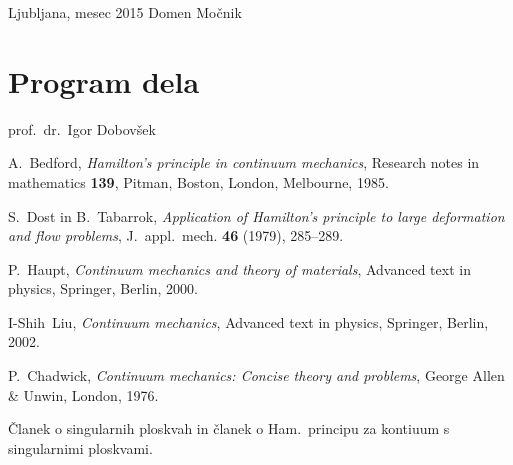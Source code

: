 \documentclass[12pt,a4paper]{report}
\begin{document}
\null

\noindent Ljubljana, mesec 2015 \hfill Domen Močnik
\pagebreak

\tableofcontents
\pagebreak

\chapter*{Program dela}


\null

\noindent prof.~dr.~Igor Dobovšek
\pagebreak


\pagebreak










\begin{thebibliography}{99}

A.~Bedford, \emph{Hamilton's principle in continuum mechanics}, Research notes in mathematics {\bf 139},
Pitman, Boston, London, Melbourne, 1985.

S.~Dost in B.~Tabarrok, \emph{Application of Hamilton's principle to large deformation and flow problems},
J.~appl.~mech. {\bf 46} (1979), 285--289.

P.~Haupt, \emph{Continuum mechanics and theory of materials}, Advanced text in physics,
Springer, Berlin, 2000.

I-Shih~Liu, \emph{Continuum mechanics}, Advanced text in physics,
Springer, Berlin, 2002.

P.~Chadwick, \emph{Continuum mechanics: Concise theory and problems},
George Allen \& Unwin, London, 1976.

\textcolor[rgb]{1,0,0}{Članek o singularnih ploskvah in članek o Ham.~principu za kontiuum s singularnimi ploskvami.}

\end{thebibliography}
\end{document}
